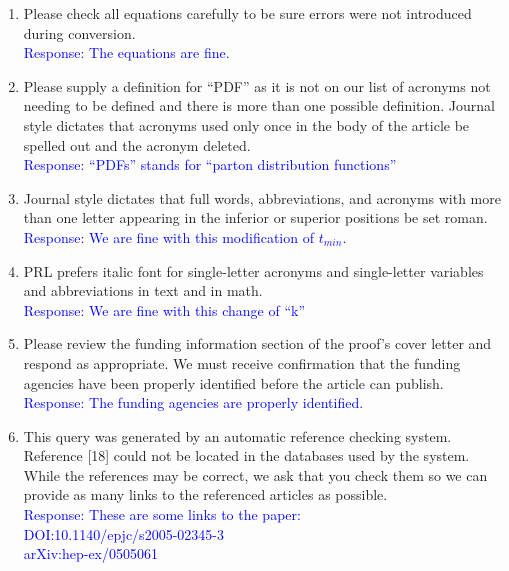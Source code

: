 \documentclass[a4paper,11pt,twoside]{article}
\begin{document}
\begin{enumerate}
      \item Please check all equations carefully to be sure errors were not 
         introduced during conversion.\\
      \textcolor{blue}{Response: The equations are fine.}

      \item Please supply a definition for ``PDF'' as it is not on our list of 
         acronyms not needing to be defined and there is more than one possible 
         definition. Journal style dictates that acronyms used only once in the 
         body of the article be spelled out and the acronym deleted.\\
      \textcolor{blue}{Response: ``PDFs'' stands for ``parton distribution 
      functions'' }
         
         
\item Journal style dictates that full words, abbreviations, and acronyms with 
   more than one letter appearing in the inferior or superior positions be set 
      roman.\\
      \textcolor{blue}{Response: We are fine with this modification of 
      $t_{min}$.}

\item PRL prefers italic font for single-letter acronyms and single-letter 
   variables and abbreviations in text and in math.\\
      \textcolor{blue}{Response: We are fine with this change of ``k'' }

\item Please review the funding information section of the proof's cover letter 
   and respond as appropriate. We must receive confirmation that the funding 
      agencies have been properly identified before the article can publish.\\
      \textcolor{blue}{Response: The funding agencies are properly identified.  
      }

\item This query was generated by an automatic reference checking system.  
   Reference [18] could not be located in the databases used by the system.  
      While the references may be correct, we ask that you check them so we can 
      provide as many links to the referenced articles as possible.\\  
      \textcolor{blue}{Response: These are some links to the paper:\\
     DOI:10.1140/epjc/s2005-02345-3\\        arXiv:hep-ex/0505061}


\end{enumerate}
\end{document}
